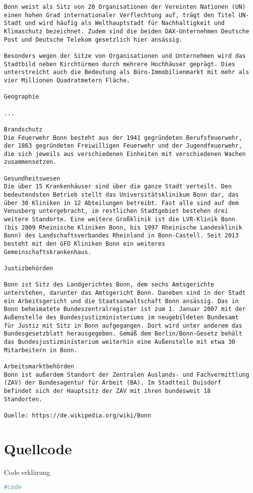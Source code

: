 \documentclass[a4paper,10pt,ngerman]{scrartcl}
\begin{document}
\begin{lstlisting}[frame=tb,breaklines=true]
Bonn weist als Sitz von 20 Organisationen der Vereinten Nationen (UN) einen hohen Grad internationaler Verflechtung auf, trägt den Titel UN-Stadt und wird häufig als Welthauptstadt für Nachhaltigkeit und Klimaschutz bezeichnet. Zudem sind die beiden DAX-Unternehmen Deutsche Post und Deutsche Telekom gesetzlich hier ansässig.

Besonders wegen der Sitze von Organisationen und Unternehmen wird das Stadtbild neben Kirchtürmen durch mehrere Hochhäuser geprägt. Dies unterstreicht auch die Bedeutung als Büro-Immobilienmarkt mit mehr als vier Millionen Quadratmetern Fläche.

Geographie

...

Brandschutz
Die Feuerwehr Bonn besteht aus der 1941 gegründeten Berufsfeuerwehr, der 1863 gegründeten Freiwilligen Feuerwehr und der Jugendfeuerwehr, die sich jeweils aus verschiedenen Einheiten mit verschiedenen Wachen zusammensetzen.

Gesundheitswesen
Die über 15 Krankenhäuser sind über die ganze Stadt verteilt. Den bedeutendsten Betrieb stellt das Universitätsklinikum Bonn dar, das über 30 Kliniken in 12 Abteilungen betreibt. Fast alle sind auf dem Venusberg untergebracht, im restlichen Stadtgebiet bestehen drei weitere Standorte. Eine weitere Großklinik ist die LVR-Klinik Bonn (bis 2009 Rheinische Kliniken Bonn, bis 1997 Rheinische Landesklinik Bonn) des Landschaftsverbandes Rheinland in Bonn-Castell. Seit 2013 besteht mit den GFO Kliniken Bonn ein weiteres Gemeinschaftskrankenhaus.

Justizbehörden

Bonn ist Sitz des Landgerichtes Bonn, dem sechs Amtsgerichte unterstehen, darunter das Amtsgericht Bonn. Daneben sind in der Stadt ein Arbeitsgericht und die Staatsanwaltschaft Bonn ansässig. Das in Bonn beheimatete Bundeszentralregister ist zum 1. Januar 2007 mit der Außenstelle des Bundesjustizministeriums im neugebildeten Bundesamt für Justiz mit Sitz in Bonn aufgegangen. Dort wird unter anderem das Bundesgesetzblatt herausgegeben. Gemäß dem Berlin/Bonn-Gesetz behält das Bundesjustizministerium weiterhin eine Außenstelle mit etwa 30 Mitarbeitern in Bonn.

Arbeitsmarktbehörden
Bonn ist außerdem Standort der Zentralen Auslands- und Fachvermittlung (ZAV) der Bundesagentur für Arbeit (BA). Im Stadtteil Duisdorf befindet sich der Hauptsitz der ZAV mit ihren bundesweit 18 Standorten.

Quelle: https://de.wikipedia.org/wiki/Bonn
\end{lstlisting}


\section{Quellcode}
Code erklärung
\begin{lstlisting}[language=Python]
    #code
\end{lstlisting}
\end{document}
